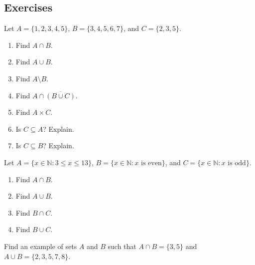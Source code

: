 \documentclass[10pt,]{book}
\theoremstyle{plain}
\theoremstyle{definition}
\theoremstyle{definition}
\theoremstyle{definition}
\theoremstyle{definition}
\numberwithin{equation}{chapter}
\def\N{\mathbb N}
\def\st{:}
\begin{document}
\subsection*{Exercises}\label{exercises_intro-sets}
\begin{divisionexercise}{1}\hypertarget{exercise-187}{}
\hypertarget{p-1639}{}%
Let \(A = \{1,2,3,4,5\}\), \(B = \{3,4,5,6,7\}\), and \(C = \{2,3,5\}\).%
\par
\hypertarget{p-1640}{}%
\leavevmode%
\begin{enumerate}[label=(\alph*)]
\item\hypertarget{li-482}{}\hypertarget{p-1641}{}%
Find \(A \cap B\).%
\item\hypertarget{li-483}{}\hypertarget{p-1642}{}%
Find \(A \cup B\).%
\item\hypertarget{li-484}{}\hypertarget{p-1643}{}%
Find \(A \setminus B\).%
\item\hypertarget{li-485}{}\hypertarget{p-1644}{}%
Find \(A \cap \overline{(B \cup C)}\).%
\item\hypertarget{li-486}{}\hypertarget{p-1645}{}%
Find \(A \times C\).%
\item\hypertarget{li-487}{}\hypertarget{p-1646}{}%
Is \(C \subseteq A\)? Explain.%
\item\hypertarget{li-488}{}\hypertarget{p-1647}{}%
Is \(C \subseteq B\)? Explain.%
\end{enumerate}
%
\end{divisionexercise}%
\begin{divisionexercise}{2}\hypertarget{exercise-188}{}
\hypertarget{p-1651}{}%
Let \(A = \{x \in \N \st 3 \le x \le 13\}\), \(B = \{x \in \N \st x \mbox{ is even} \}\), and \(C = \{x \in \N \st x \mbox{ is odd} \}\).%
\par
\hypertarget{p-1652}{}%
\leavevmode%
\begin{enumerate}[label=(\alph*)]
\item\hypertarget{li-496}{}\hypertarget{p-1653}{}%
Find \(A \cap B\).%
\item\hypertarget{li-497}{}\hypertarget{p-1654}{}%
Find \(A \cup B\).%
\item\hypertarget{li-498}{}\hypertarget{p-1655}{}%
Find \(B \cap C\).%
\item\hypertarget{li-499}{}\hypertarget{p-1656}{}%
Find \(B \cup C\).%
\end{enumerate}
%
\end{divisionexercise}%
\begin{divisionexercise}{3}\hypertarget{exercise-189}{}
\hypertarget{p-1657}{}%
Find an example of sets \(A\) and \(B\) such that \(A\cap B = \{3, 5\}\) and \(A \cup B = \{2, 3, 5, 7, 8\}\).%
\end{divisionexercise}%
\end{document}
